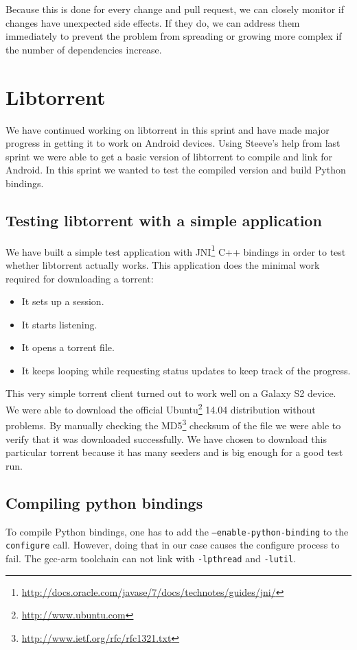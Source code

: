 		Because this is done for every change and pull request, we can closely monitor if changes have unexpected side effects. If they do, we can address them immediately to prevent the problem from spreading or growing more complex if the number of dependencies increase.
		
	
	\section{Libtorrent}
		We have continued working on libtorrent in this sprint and have made major progress in getting it to work on Android devices. Using Steeve's help from last sprint we were able to get a basic version of libtorrent to compile and link for Android. In this sprint we wanted to test the compiled version and build Python bindings.
		
		\subsection{Testing libtorrent with a simple application}
			We have built a simple test application with JNI\footnote{\url{http://docs.oracle.com/javase/7/docs/technotes/guides/jni/}} C++ bindings in order to test whether libtorrent actually works. This application does the minimal work required for downloading a torrent:
			\begin{itemize}
				\item It sets up a session.
				\item It starts listening.
				\item It opens a torrent file.
				\item It keeps looping while requesting status updates to keep track of the progress.
			\end{itemize}
			This very simple torrent client turned out to work well on a Galaxy S2 device. We were able to download the official Ubuntu\footnote{\url{http://www.ubuntu.com}} 14.04 distribution without problems. By manually checking the MD5\footnote{\url{http://www.ietf.org/rfc/rfc1321.txt}} checksum of the file we were able to verify that it was downloaded successfully. We have chosen to download this particular torrent because it has many seeders and is big enough for a good test run.
		
		\subsection{Compiling python bindings}
			To compile Python bindings, one has to add the \texttt{--enable-python-binding} to the \texttt{configure} call. However, doing that in our case causes the configure process to fail. The gcc-arm toolchain can not link with \texttt{-lpthread} and \texttt{-lutil}.
			
